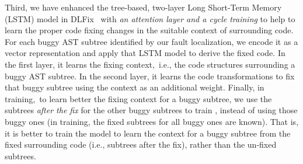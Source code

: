 Third, we have enhanced the tree-based, two-layer Long Short-Term
Memory (LSTM) model in DLFix~\cite{icse20} with {\em an attention
  layer and a cycle training} to help {\tool} to learn the proper code
fixing changes in the suitable context of surrounding code. For each
buggy AST subtree identified by our fault localization, we encode it
as a vector representation and apply that LSTM model to derive the
fixed code.
%
In the first layer, it learns the fixing context,~i.e., the code
structures surrounding a buggy AST subtree. In the second layer, it
learns the code transformations to fix that buggy subtree using the
context as an additional weight. Finally, in training,~to learn better
the fixing context for a buggy subtree, we use the subtrees {\em after
  the fix} for the other buggy subtrees to train {\tool}, instead of
using those buggy ones (in training, the fixed subtrees for all buggy
ones are known). That is, it is better to train the model to learn the
context for a buggy subtree from the fixed surrounding code (i.e.,
subtrees after the fix), rather than the un-fixed subtrees.



%





